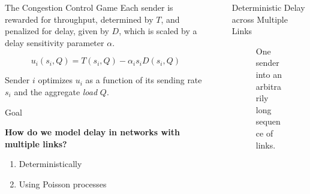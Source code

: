 \documentclass[final]{beamer}
\newlength{\sepwidth}
\newlength{\colwidth}
\newcommand{\separatorcolumn}{\begin{column}{\sepwidth}\end{column}}
\begin{document}
\begin{frame}[t]
\begin{columns}[t]
\begin{column}{\colwidth}
\begin{block}{The Congestion Control Game}
    Each sender is rewarded for throughput, determined by $T$, and penalized for
     delay, given by $D$, which is scaled by a delay sensitivity parameter $\alpha$.
    
    {\Large\[u_i(s_i, Q) = T(s_i, Q) - \alpha_i s_i D(s_i, Q) \]}

    Sender $i$ optimizes $u_i$ as a function of its sending rate $s_i$ and the
    aggregate \textit{load} $Q$.
  \end{block}

  \begin{block}{Goal}
    \begin{Large}
      \begin{center}
        \textbf{How do we model delay in networks with multiple links?}
        \begin{enumerate}
          \item Deterministically
          \item Using Poisson processes
        \end{enumerate}
      \end{center}
    \end{Large}

  \end{block}

\end{column}

\separatorcolumn

\begin{column}{\colwidth}

  \begin{block}{Deterministic Delay across Multiple Links}
    \begin{figure}
      \centering
      \caption{One sender into an arbitrarily long sequence of links.}
    \end{figure}
      

\end{block}
\end{column}
\end{columns}
\end{frame}
\end{document}
